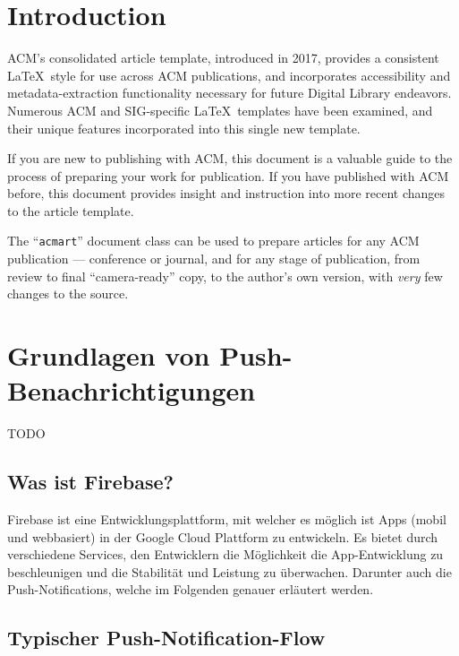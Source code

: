 \documentclass[sigconf]{acmart}
\begin{document}
\section{Introduction}

ACM's consolidated article template, introduced in 2017, provides a
consistent \LaTeX\ style for use across ACM publications, and
incorporates accessibility and metadata-extraction functionality
necessary for future Digital Library endeavors. Numerous ACM and
SIG-specific \LaTeX\ templates have been examined, and their unique
features incorporated into this single new template.

If you are new to publishing with ACM, this document is a valuable
guide to the process of preparing your work for publication. If you
have published with ACM before, this document provides insight and
instruction into more recent changes to the article template.

The ``\verb|acmart|'' document class can be used to prepare articles
for any ACM publication --- conference or journal, and for any stage
of publication, from review to final ``camera-ready'' copy, to the
author's own version, with {\itshape very} few changes to the source.

\section{Grundlagen von Push-Benachrichtigungen}
TODO

\subsection{Was ist Firebase?}

Firebase ist eine Entwicklungsplattform, mit welcher es möglich ist 
Apps (mobil und webbasiert) in der Google Cloud Plattform zu entwickeln.
Es bietet durch verschiedene Services, den Entwicklern die Möglichkeit 
die App-Entwicklung zu beschleunigen und die Stabilität und Leistung 
zu überwachen. Darunter auch die Push-Notifications, welche im Folgenden 
genauer erläutert werden.

\subsection{Typischer Push-Notification-Flow}
\end{document}
